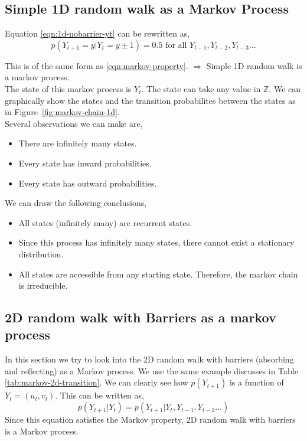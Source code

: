 \documentclass[a4paper]{article}
\newcommand\figref{Figure~\ref}
\begin{document}
\subsection{Simple 1D random walk as a Markov Process}
Equation \eqref{eqn:1d-nobarrier-yt} can be rewritten as,
$$p(Y_{t+1} = y | Y_t = y\pm1) =0.5 \textrm{ for all }Y_{t-1},Y_{t-2},Y_{t-3}...$$





This is of the same form as \eqref{eqn:markov-property}. $\Rightarrow$ Simple 1D random walk is a markov process.\\

The state of this markov process is $Y_t$. The state can take any value in $\mathbb{Z}$. We can graphically show the states and the transition probabilites between the states as in  \figref{fig:markov-chain-1d}.\\

Several observations we can make are,
\begin{itemize}
    \item There are infinitely many states.
    \item Every state has inward probabilities.
    \item Every state has outward probabilities.
\end{itemize}
We can draw the following conclusions,
\begin{itemize}
    \item All states (infinitely many) are recurrent states.
    
    \item Since this process has infinitely many states, there cannot exist a stationary distribution.
    \item All states are accessible from any starting state. Therefore, the markov chain is irreducible.
\end{itemize}





\subsection{2D random walk with Barriers as a markov process}

In this section we try to look into the 2D random walk with barriers (absorbing and reflecting) as a Markov process. We use the same example discusses in Table \ref{tab:markov-2d-transition}. We can clearly see how $p(Y_{t+1})$ is a function of $Y_t = (u_t,v_t)$.  This can be written as,
$$p(Y_{t+1} | Y_t) = p(Y_{t+1} | Y_t, Y_{t-1}, Y_{t-2} ...)$$
Since this equation satisfies the Markov property, 2D random walk with barriers is a Markov process.
\end{document}
